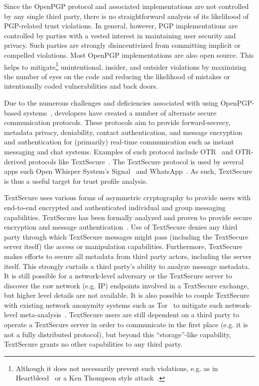 Since the OpenPGP protocol and associated implementations are not
controlled by any single third party, there is no straightforward
analysis of its likelihood of PGP-related trust violations. In
general, however, PGP implementations are controlled by parties with a
vested interest in maintaining user security and privacy. Such parties
are strongly disincentivized from committing implicit or compelled
violations. Most OpenPGP implementations are also open source. This
helps to mitigate\footnote{Although it does not necessarily prevent
  such violations, e.g. as in Heartbleed~\cite{heartbleed} or a Ken
  Thompson style attack~\cite{thompson1984}.} unintentional, insider,
and outsider violations by maximizing the number of eyes on the code
and reducing the likelihood of mistakes or intentionally coded
vulnerabilities and back doors.

Due to the numerous challenges and deficiencies associated with using
OpenPGP-based systems~\cite{green-pgp}, developers have created a
number of alternate secure communication protocols. These protocols
aim to provide forward-secrecy, metadata privacy, deniability, contact
authentication, and message encryption and authentication for
(primarily) real-time communication such as instant messaging and chat
systems. Examples of such protocol include OTR~\cite{otr-v3} and
OTR-derived protocols like TextSecure~\cite{otr-advanced-ratchet}. The
TextSecure protocol is used by several apps such Open Whisper System's
Signal~\cite{openwhisper} and WhatsApp~\cite{whatsapp}. As such,
TextSecure is thus a useful target for trust profile analysis.

TextSecure uses various forms of asymmetric cryptography to provide
users with end-to-end encrypted and authenticated individual and group
messaging capabilities. TextSecure has been formally analyzed and
proven to provide secure encryption and message
authentication~\cite{frosch2014}. Use of TextSecure denies any third
party through which TextSecure messages might pass (including the
TextSecure server itself) the access or manipulation
capabilities. Furthermore, TextSecure makes efforts to secure all
metadata from third party actors, including the server itself. This
strongly curtails a third party's ability to analyze message
metadata. It is still possible for a network-level adversary or the
TextSecure server to discover the raw network (e.g. IP) endpoints
involved in a TextSecure exchange, but higher level details are not
available. It is also possible to couple TextSecure with existing
network anonymity systems such as Tor~\cite{dingledine2004} to
mitigate such network-level
meta-analysis~\cite{intercept-chatting}. TextSecure users are still
dependent on a third party to operate a TextSecure server in order to
communicate in the first place (e.g. it is not a fully distributed
protocol), but beyond this ``storage''-like capability, TextSecure
grants no other capabilities to any third party.

